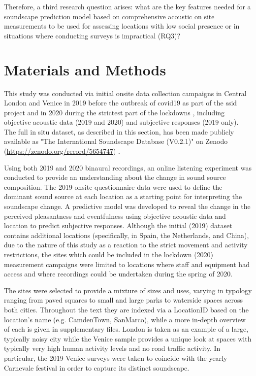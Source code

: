  Therefore, a third research question arises: what are the key features needed for a soundscape prediction model based on comprehensive acoustic on site measurements to be used for assessing locations with low social presence or in situations where conducting surveys is impractical (RQ3)?

\section{Materials and Methods}

 This study was conducted via initial onsite data collection campaigns in Central London and Venice in 2019 before the outbreak of \gls{covid19} as part of the \gls{ssid} project \citep{Mitchell2020Soundscape} and in 2020 during the strictest part of the lockdowns \citep{Aletta2020Assessing}, including objective acoustic data (2019 and 2020) and subjective responses (2019 only). The full in situ dataset, as described in this section, has been made publicly available as "The International Soundscape Database (V0.2.1)" on Zenodo (\url{https://zenodo.org/record/5654747}) \citep{Mitchell2021International}.
 
 Using both 2019 and 2020 binaural recordings, an online listening experiment was conducted to provide an understanding about the change in sound source composition. The 2019 onsite questionnaire data were used to define the dominant sound source at each location as a starting point for interpreting the soundscape change. A predictive model was developed to reveal the change in the perceived pleasantness and eventfulness using objective acoustic data and location to predict subjective responses. Although the initial (2019) dataset contains additional locations (specifically, in Spain, the Netherlands, and China), due to the nature of this study as a reaction to the strict movement and activity restrictions, the sites which could be included in the lockdown (2020) measurement campaigns were limited to locations where staff and equipment had access and where recordings could be undertaken during the spring of 2020.

 The sites were selected to provide a mixture of sizes and uses, varying in typology ranging from paved squares to small and large parks to waterside spaces across both cities. Throughout the text they are indexed via a LocationID based on the location's name (e.g. CamdenTown, SanMarco), while a more in-depth overview of each is given in supplementary files. %
 London is taken as an example of a large, typically noisy city while the Venice sample provides a unique look at spaces with typically very high human activity levels and no road traffic activity. In particular, the 2019 Venice surveys were taken to coincide with the yearly Carnevale festival in order to capture its distinct soundscape.

